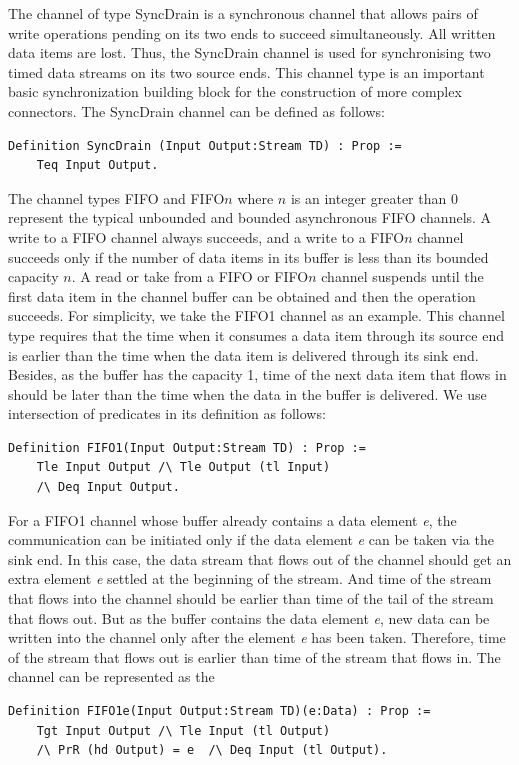 \documentclass[3p,times]{elsarticle}
\begin{document}
The channel of type SyncDrain is a synchronous channel that allows pairs of write operations pending on its two ends to succeed simultaneously. All written data items are lost. Thus, the SyncDrain channel is used for synchronising two timed data streams on its two source ends. This channel type is an important basic synchronization building block for the construction of more complex connectors. The SyncDrain channel can be defined as follows:
\begin{lstlisting}[language=coq]
    Definition SyncDrain (Input Output:Stream TD) : Prop :=
    Teq Input Output.
\end{lstlisting}


The channel types FIFO and FIFO$n$ where $n$ is an integer greater than $0$ represent the
typical unbounded and bounded asynchronous FIFO channels. A write to a FIFO channel always succeeds, and a write to a FIFO$n$ channel succeeds only if the
number of data items in its buffer is less than its bounded capacity $n$. A read or take from a FIFO or FIFO$n$ channel suspends until the first data item
in the channel buffer can be obtained and then the operation succeeds.
For simplicity, we take the FIFO1 channel as an example. This channel type requires that the time when it consumes a data item through its source end is earlier than the time when the data item is delivered through its sink end. Besides, as the buffer has the capacity 1, time of the next data item that flows in should be later than the time when the data in the buffer is delivered. We use intersection of predicates in its definition as follows:
\begin{lstlisting}[language=coq]
    Definition FIFO1(Input Output:Stream TD) : Prop :=
    Tle Input Output /\ Tle Output (tl Input)
    /\ Deq Input Output.
\end{lstlisting}

For a FIFO1 channel whose buffer already contains a data element \emph{e}, the communication can be initiated only if the data element \emph{e} can be taken via the sink end. In this case, the data stream that flows out of the channel should get an extra element \emph{e} settled at the beginning of the stream. And time of the stream that flows into the channel should be earlier than time of the tail of the stream that flows out. But as the buffer contains the data element \emph{e}, new data can be written into the channel only after the element \emph{e} has been taken. Therefore, time of the stream that flows out is earlier than time of the stream that flows in. The channel can be represented as the \begin{lstlisting}[language=coq]
    Definition FIFO1e(Input Output:Stream TD)(e:Data) : Prop :=
    Tgt Input Output /\ Tle Input (tl Output)
    /\ PrR (hd Output) = e  /\ Deq Input (tl Output).
\end{lstlisting}
\end{document}
